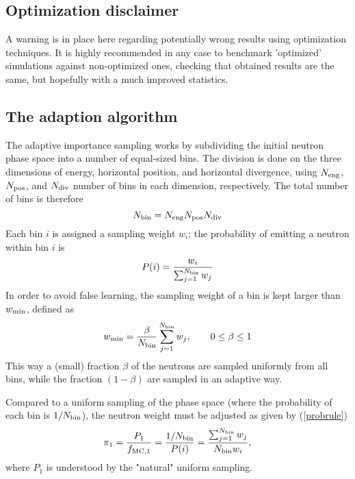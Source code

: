 \subsection{Optimization disclaimer}

A warning is in place here regarding potentially wrong results
using optimization techniques.
It is highly recommended in any case to benchmark 'optimized' simulations
against non-optimized ones, checking that obtained results are the same,
but hopefully with a much improved statistics.

\subsection{The adaption algorithm}

The adaptive importance sampling works by subdividing the initial
neutron phase space into a number of equal-sized bins. The division is
done on the three dimensions of energy, horizontal position, and
horizontal divergence, using $N_{\rm eng}$, $N_{\rm pos}$, and $N_{\rm
  div}$ number of bins in each dimension, respectively. The total number
of bins is therefore
\begin{equation}
N_{\rm bin} = N_{\rm eng} N_{\rm pos} N_{\rm div}
\end{equation}
Each bin $i$ is assigned a sampling weight $w_i$; the probability of
emitting a neutron within bin $i$ is
\begin{equation}
P(i) = \frac{w_i}{\sum_{j=1}^{N_{\rm bin}} w_j}
\end{equation}
In order to avoid false learning, the sampling weight of a bin is
kept larger than $w_{\rm min}$, defined as
\begin{equation}
w_{\rm min} = \frac{\beta}{N_{\rm bin}}\sum_{j=1}^{N_{\rm bin}}w_j,\qquad
    0 \leq \beta \leq 1
\end{equation}
This way a (small) fraction $\beta$ of the neutrons are sampled
uniformly from all bins, while the fraction $(1 - \beta)$ are sampled in an adaptive way.

Compared to a uniform sampling of the phase space (where the probability
of each bin is $1/N_{\rm bin}$), the neutron weight
must be adjusted as given by (\ref{probrule})
\begin{equation}
\pi_1 = \frac{P_1}{f_{\rm MC,1}} =\frac{1/N_{\rm bin}}{P(i)} =
    \frac{\sum_{j=1}^{N_{\rm bin}} w_j}{N_{\rm bin} w_i} ,
\end{equation}
where $P_1$ is understood by the "natural" uniform sampling.

